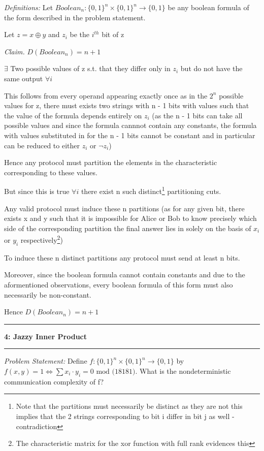 \documentclass[11pt]{article}
\newcommand\question[2]{\vspace{.25in}\hrule\textbf{#1: #2}\vspace{.5em}\hrule\vspace{.10in}}
\newcommand\problem{\emph{Problem Statement:}\newline}
\newcommand\definitions{\emph{Definitions:}\newline}
\newcommand\claim{\emph{Claim.}\newline}
\begin{document}
\definitions
Let $Boolean_n: {\{0, 1\}}^n \times {\{0, 1\}}^n \to \{0, 1\}$ be any boolean formula of the form described in the problem statement. 

Let $z = x \oplus y$ and $z_i$ be the $i^{th}$ bit of z

\claim
$D(Boolean_n) = n + 1$ 

\proof 
$\exists$ Two possible values of z s.t. that they differ only in $z_i$ but do not have the same output $\forall i$

This follows from every operand appearing exactly once as in the $2^n$ possible values for z, there must exists two strings with n - 1 bits with values such that the value of the formula depends entirely on $z_i$ (as the n - 1 bits can take all possible values and since the formula cannnot contain any constants, the formula with values substituted in for the n - 1 bits cannot be constant and in particular can be reduced to either $z_i$ or $\lnot z_i$)

Hence any protocol must partition the elements in the characteristic corresponding to these values. 

But since this is true $\forall i$ there exist n such distinct\footnote{Note that the partitions must necessarily be distinct as they are not this implies that the 2 strings corresponding to bit i differ in bit j as well - contradiction} partitioning cuts. 

Any valid protocol must induce these n partitions (as for any given bit, there exists x and y such that it is impossible for Alice or Bob to know precisely which side of the corresponding partition the final answer lies in solely on the basis of $x_i$ or $y_i$ respectively\footnote{The characteristic matrix for the xor function with full rank evidences this})

To induce these n distinct partitions any protocol must send at least n bits.

Moreover, since the boolean formula cannot contain constants and due to the aformentioned observations, every boolean formula of this form must also necessarily be non-constant. 

Hence $D(Boolean_n) = n + 1$ 

\newpage

\question{4}{Jazzy Inner Product}

\problem
Define $f: {\{0, 1\}}^n \times {\{0, 1\}}^n \to \{0, 1\}$ by $f(x, y) = 1 \iff \sum{x_i \cdot y_i} = 0 \text{ mod (18181)}.$ What is the nondeterministic communication complexity of f?
\end{document}
